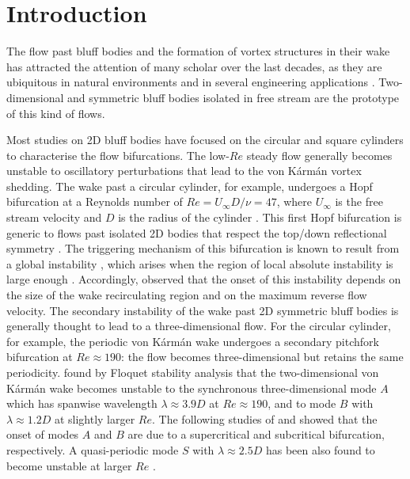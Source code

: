\section{Introduction}

The flow past bluff bodies and the formation of vortex structures in their wake has attracted the attention of many scholar over the last decades, as they are ubiquitous in natural environments and in several engineering applications \citep{oertel-1990,williamson-1996b,choi-etal-2008,thompson-etal-2021}. Two-dimensional and symmetric bluff bodies isolated in free stream are the prototype of this kind of flows.

Most studies on 2D bluff bodies have focused on the circular and square cylinders to characterise the flow bifurcations. The low-$Re$ steady flow generally becomes unstable to oscillatory perturbations that lead to the von K\'{a}rm\'{a}n vortex shedding. The wake past a circular cylinder, for example, undergoes a Hopf bifurcation at a Reynolds number of $Re = U_\infty D /\nu = 47$, where $U_\infty$ is the free stream velocity and $D$ is the radius of the cylinder \cite{noack.eckelmann-1994-globalstability}. This first Hopf bifurcation is generic to flows past isolated 2D bodies that respect the top/down reflectional symmetry \citep{jackson-1987-finiteelementstudy,chiarini-quadrio-auteri-2022b}. The triggering mechanism of this bifurcation is known to result from a global instability \citep{jackson-1987-finiteelementstudy}, which arises when the region of local absolute instability is large enough \citep{chomaz-2005}. Accordingly, \cite{chiarini-quadrio-auteri-2022b} observed that the onset of this instability depends on the size of the wake recirculating region and on the maximum reverse flow velocity.
%
The secondary instability of the wake past 2D symmetric bluff bodies is generally thought to lead to a three-dimensional flow. For the circular cylinder, for example, the periodic von K\'{a}rm\'{a}n wake undergoes a secondary pitchfork bifurcation at $Re \approx 190$: the flow becomes three-dimensional but retains the same periodicity. \cite{barkley-henderson-1996} found by Floquet stability analysis that the two-dimensional von K\'{a}rm\'{a}n wake becomes unstable to the synchronous three-dimensional mode $A$ which has spanwise wavelength $\lambda \approx 3.9 D$ at $Re \approx 190$, and to mode $B$ with $\lambda \approx 1.2 D$ at slightly larger $Re$. The following studies of \cite{henderson-barkley-1996} and \cite{henderson-1997} showed that the onset of modes $A$ and $B$ are due to a supercritical and subcritical bifurcation, respectively. A quasi-periodic mode $S$ with $\lambda \approx 2.5D$ has been also found to become unstable at larger $Re$ \citep{blackburn-lopez-2003,blackburn-etal-2005,blackburn-sheard-2010}. 

